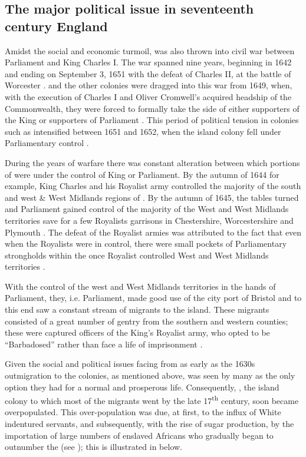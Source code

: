 \subsection{The major political issue in seventeenth century England}\label{6.1.2}
Amidst the social and economic turmoil,  was also thrown into civil war between Parliament and King Charles I. The war spanned nine years, beginning in 1642 and ending on September 3, 1651 with the defeat of Charles II, at the battle of Worcester \citep{Young73}.  and the other  colonies were dragged into this war from 1649, when, with the execution of Charles I and Oliver Cromwell's acquired headship of the Commonwealth, they were forced to formally take the side of either supporters of the King or supporters of Parliament \citep{Ligon73}. This period of political tension in colonies such as  intensified between 1651 and 1652, when the island colony fell under Parliamentary control \citep{Ligon73, Fraser90}.

During the years of warfare there was constant alteration between which portions of  were under the control of King or Parliament. By the autumn of 1644 for example, King Charles and his Royalist army controlled the majority of the south and west \& West Midlands regions of . By the autumn of 1645, the tables turned and Parliament gained control of the majority of the West and West Midlands territories save for a few Royalists garrisons in Chestershire, Worcestershire and Plymouth \citep{Gaunt03}. The defeat of the Royalist armies was attributed to the fact that even when the Royalists were in control, there were small pockets of Parliamentary strongholds within the once Royalist controlled West and West Midlands territories \citep{Gaunt03}.

With the control of the west and West Midlands territories in the hands of Parliament, they, i.e. Parliament, made good use of the city port of Bristol and to this end  saw a constant stream of  migrants to the island. These migrants consisted of a great number of gentry from the southern and western counties; these were captured officers of the King's Royalist army, who opted to be {``Barbadosed''} rather than face a life of imprisonment \citep{Harlow26, Pugh57, Wheeler02, Manning06}.

Given the social and political issues facing  from as early as the 1630s outmigration to the  colonies, as mentioned above, was seen by many as the only option they had for a normal and prosperous life. Consequently, , the island colony to which most of the migrants went by the late 17\textsuperscript{th} century, soon became overpopulated. This over-population was due, at first, to the influx of White indentured servants, and subsequently, with the rise of sugar production, by the importation of large numbers of enslaved Africans \citep{James98} who gradually began to outnumber the  (see \citealt{Campbell77, Campbell84, Campbell93,  McCusker91, Galenson02}); this is illustrated in  below.

